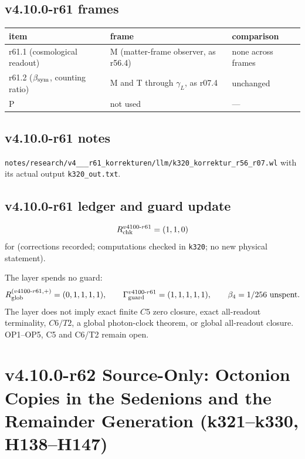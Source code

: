 \subsection*{v4.10.0-r61 frames}
\label{subsec:v4100-r61-frames}

\begin{center}
\small
\begin{tabular}{@{}lll@{}}
\toprule
item & frame & comparison\\
\midrule
r61.1 (cosmological readout) & M (matter-frame observer, as r56.4) & none across frames\\
r61.2 (\(\beta_{\rm sym}\), counting ratio) & M and T through \(\gamma_L\), as r07.4 & unchanged\\
P & not used & ---\\
\bottomrule
\end{tabular}
\end{center}

\subsection*{v4.10.0-r61 notes}
\label{subsec:v4100-r61-notes}

{\raggedright
\texttt{notes/\allowbreak research/\allowbreak v4\_\_\_\allowbreak r61\_\allowbreak korrekturen/\allowbreak llm/\allowbreak k320\_\allowbreak korrektur\_\allowbreak r56\_\allowbreak r07.wl}
with its actual output \texttt{k320\_\allowbreak out.txt}.
\par}

\subsection*{v4.10.0-r61 ledger and guard update}
\label{subsec:v4100-r61-ledger-guard}

\[
R_{\rm chk}^{v4100\text{-}r61}=(1,1,0)
\]
for (corrections recorded; computations checked in \texttt{k320}; no new physical statement).

The layer spends no guard:
\[
R_{\rm glob}^{(v4100\text{-}r61,+)}=(0,1,1,1,1),
\qquad
\Gamma_{\rm guard}^{v4100\text{-}r61}=(1,1,1,1,1),
\qquad
\beta_4=1/256\ \text{unspent}.
\]
The layer does not imply exact finite \(C5\) zero closure, exact all-readout terminality, \(C6/T2\), a global photon-clock theorem,
or global all-readout closure.  OP1--OP5, C5 and C6/T2 remain open.

\clearpage
\section*{v4.10.0-r62 Source-Only: Octonion Copies in the Sedenions and the Remainder Generation (k321--k330, H138--H147)}
\label{sec:v4100-r62-sedenion-copies}

